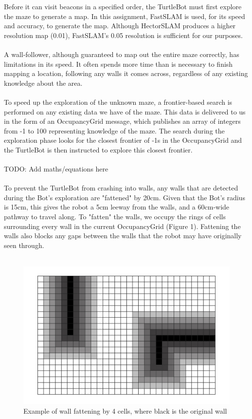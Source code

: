 \documentclass[titlepage,12pt,a4paper]{article}
\begin{document}
Before it can visit beacons in a specified order, the TurtleBot must first explore the maze to generate a map. In this assignment, FastSLAM is used, for its speed and accuracy, to generate the map. Although HectorSLAM produces a higher resolution map (0.01), FastSLAM's 0.05 resolution is sufficient for our purposes.\\
\\
A wall-follower, although guaranteed to map out the entire maze correctly, has limitations in its speed. It often spends more time than is necessary to finish mapping a location, following any walls it comes across, regardless of any existing knowledge about the area.\\
\\
To speed up the exploration of the unknown maze, a frontier-based search is performed on any existing data we have of the maze. This data is delivered to us in the form of an OccupancyGrid message, which publishes an array of integers from -1 to 100 representing knowledge of the maze. The search during the exploration phase looks for the closest frontier of -1s in the OccupancyGrid and the TurtleBot is then instructed to explore this closest frontier.\\
\\
TODO: Add maths/equations here\\
\\
To prevent the TurtleBot from crashing into walls, any walls that are detected during the Bot's exploration are "fattened" by 20cm. Given that the Bot's radius is 15cm, this gives the robot a 5cm leeway from the walls, and a 60cm-wide pathway to travel along. To "fatten" the walls, we occupy the rings of cells surrounding every wall in the current OccupancyGrid (Figure 1). Fattening the walls also blocks any gaps between the walls that the robot may have originally seen through.\\
\\
\pagebreak

\begin{figure}
	\centering
	\includegraphics[scale=0.28]{wallfatten.jpg}
	\caption{Example of wall fattening by 4 cells, where black is the original wall}
\end{figure}
\end{document}
